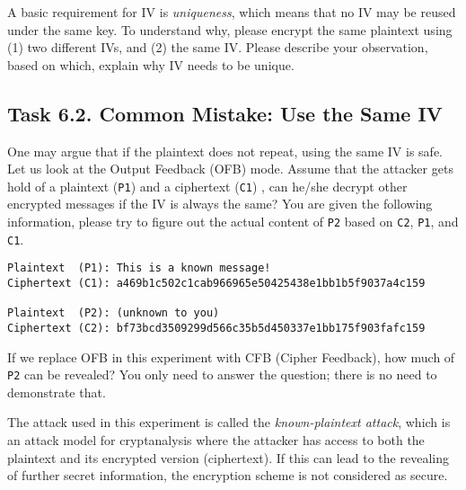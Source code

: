 A basic requirement for IV is \textit{uniqueness},
which means that no IV may be reused under the same key. To understand why,
please encrypt the same plaintext using (1) two different IVs, and (2)
the same IV. Please describe your observation, based on which, explain why
IV needs to be unique.   



\subsection{Task 6.2. Common Mistake: Use the Same IV} 

One may argue that if the plaintext does not repeat, using 
the same IV is safe. Let us look at the Output Feedback (OFB) mode. 
Assume that the attacker gets hold of a plaintext (\texttt{P1})  
and a ciphertext (\texttt{C1}) , 
can he/she decrypt other encrypted messages if the IV is always the same? 
You are given the following information, please try to figure out
the actual content of \texttt{P2} based on \texttt{C2}, \texttt{P1},
and \texttt{C1}. 


\begin{lstlisting}
Plaintext  (P1): This is a known message!
Ciphertext (C1): a469b1c502c1cab966965e50425438e1bb1b5f9037a4c159

Plaintext  (P2): (unknown to you)
Ciphertext (C2): bf73bcd3509299d566c35b5d450337e1bb175f903fafc159
\end{lstlisting}
 
If we replace OFB in this experiment with 
CFB (Cipher Feedback), how much of \texttt{P2} can be revealed? You
only need to answer the question; there is no need to demonstrate that.

The attack used in this experiment is called the \textit{known-plaintext
attack}, which is an attack model for cryptanalysis where the
attacker has access to both the plaintext and its
encrypted version (ciphertext). If this can lead to
the revealing of further secret information, the encryption scheme is 
not considered as secure. 





